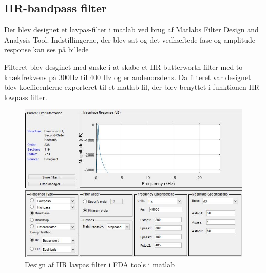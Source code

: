  
\subsection{IIR-bandpass filter}
Der blev designet et lavpas-filter i matlab ved brug af Matlabs Filter Design and Analysis Tool. Indstillingerne, der blev sat og det vedhæftede fase og amplitude response kan ses på billede 

Filteret blev desginet med ønske i at skabe et IIR butterworth filter med to knækfrekvens på 300Hz til 400 Hz og er andenorsdens. 
Da filteret var designet blev koefficenterne exporteret til et matlab-fil, der blev benyttet i funktionen IIR-lowpass filter.

\begin{figure}[H]
	\centering
	\includegraphics[width=150mm]{figures/IIRlavpas.jpg}
	\caption{Design af IIR lavpas filter i FDA tools i matlab}
	\label{fig:FDAtools}
\end{figure}


